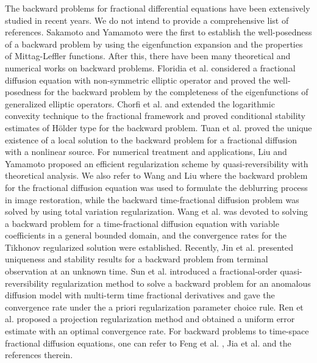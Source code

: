 \documentclass[11pt]{article}
\numberwithin{equation}{section}
\begin{document}
The backward problems for fractional differential equations have been extensively studied in recent years. We do not intend to provide a comprehensive list of references. Sakamoto and Yamamoto \cite{sakamoto2011initial} were the first to establish the well-posedness of a backward problem by using the eigenfunction expansion and the properties of Mittag-Leffler functions. After this, there have been many theoretical and numerical works on backward problems. Floridia et al. \cite{floridia2020backward} considered a fractional diffusion equation with non-symmetric elliptic operator and proved the well-posedness for the backward problem by the completeness of the eigenfunctions of generalized elliptic operators. Chorfi et al. \cite{Chorfi2024backward} and \cite{Chorfi2022log} extended the logarithmic convexity technique to the fractional framework and proved conditional stability estimates of H\"older type for the backward problem. Tuan et al. \cite{Tuan2019backward} proved the unique existence of a local solution to the backward problem for a fractional diffusion with a nonlinear source. For numerical treatment and applications, Liu and Yamamoto \cite{Liu2010backward} proposed an efficient regularization scheme by quasi-reversibility with theoretical analysis. We also refer to Wang and Liu \cite{Wang2013total} where the backward problem for the fractional diffusion equation was used to formulate the deblurring process in image restoration, while the backward time-fractional diffusion problem was solved by using total variation regularization. Wang et al. \cite{Wang2013tikhonov} was devoted to solving a backward problem for a time-fractional diffusion equation with variable coefficients in a general bounded domain, and the convergence rates for the Tikhonov regularized solution were established. Recently, Jin et al. \cite{Jin2023inverse} presented uniqueness and stability results for a backward problem from terminal observation at an unknown time. Sun et al. \cite{Sun2023fractional} introduced a fractional-order quasi-reversibility regularization method to solve a backward problem for an anomalous diffusion model with multi-term time fractional derivatives and gave the convergence rate under the a priori regularization parameter choice rule. Ren et al. \cite{Ren2023regula} proposed a projection regularization method and obtained a uniform error estimate with an optimal convergence rate. For backward problems to time-space fractional diffusion equations, one can refer to Feng et al. \cite{Feng2024numerical}, Jia et al. \cite{Jia2018backward} and the references therein.
\end{document}
